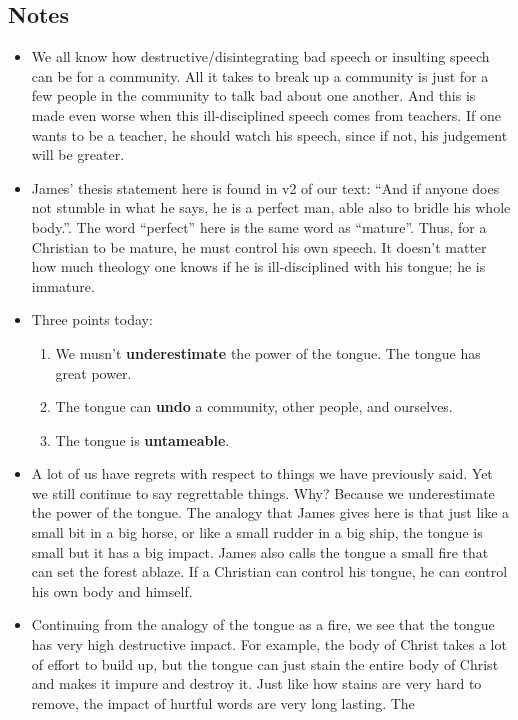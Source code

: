 \subsection*{Notes}
\begin{itemize}
  \item{We all know how destructive/disintegrating bad speech or insulting
  speech can be for a community. All it takes to break up a community is just
  for a few people in the community to talk bad about one another. And this
  is made even worse when this ill-disciplined speech comes from teachers. If
  one wants to be a teacher, he should watch his speech, since if not, his
  judgement will be greater.}
  \item{James' thesis statement here is found in v2 of our text: ``And if
  anyone does not stumble in what he says, he is a perfect man, able also to
  bridle his whole body.''. The word ``perfect'' here is the same word as
  ``mature''. Thus, for a Christian to be mature, he must control his own
  speech. It doesn't matter how much theology one knows if he is
  ill-disciplined with his tongue; he is immature.}
  \item{Three points today: 
  \begin{enumerate}
    \item{We musn't \textbf{underestimate} the power of the tongue. The
    tongue has great power.}
    \item{The tongue can \textbf{undo} a community, other people, and ourselves.}
    \item{The tongue is \textbf{untameable}. }
  \end{enumerate}}
  \item{A lot of us have regrets with respect to things we have previously
  said. Yet we still continue to say regrettable things. Why? Because we
  underestimate the power of the tongue. The analogy that James gives here is
  that just like a small bit in a big horse, or like a small rudder in a big
  ship, the tongue is small but it has a big impact. James also calls the
  tongue a small fire that can set the forest ablaze. If a Christian can control his tongue, he can control his own body and himself.}
  \item{Continuing from the analogy of the tongue as a fire, we see that the
  tongue has very high destructive impact. For example, the body of Christ
  takes a lot of effort to build up, but the tongue can just stain the entire
  body of Christ and makes it impure and destroy it. Just like how stains are
  very hard to remove, the impact of hurtful words are very long lasting. The
}
\end{itemize}
